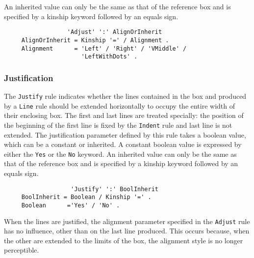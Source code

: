 An inherited value can only be the same as that of the reference box
and is specified by a kinship keyword followed by an equals sign.

\begin{verbatim}
                  'Adjust' ':' AlignOrInherit
     AlignOrInherit = Kinship '=' / Alignment .
     Alignment      = 'Left' / 'Right' / 'VMiddle' /
                      'LeftWithDots' .
\end{verbatim}

\subsubsection{Justification}

The {\tt Justify} rule indicates whether the lines contained in the
box and produced by a {\tt Line} rule should be extended horizontally
to occupy the entire width of their enclosing box.  The first and last
lines are treated specially: the position of the beginning of the
first line is fixed by the {\tt Indent} rule and last line is not
extended.  The justification parameter defined by this rule takes a
boolean value, which can be a constant or inherited.  A constant
boolean value is expressed by either the {\tt Yes} or the {\tt No}
keyword.  An inherited value can only be the same as that of the
reference box and is specified by a kinship keyword followed by an
equals sign.

\begin{verbatim}
                   'Justify' ':' BoolInherit
     BoolInherit = Boolean / Kinship '=' .
     Boolean      ='Yes' / 'No' .
\end{verbatim}

When the lines are justified, the alignment parameter specified in the
{\tt Adjust} rule has no influence, other than on the last line
produced.  This occurs because, when the other are extended to the
limits of the box, the alignment style is no longer perceptible.

